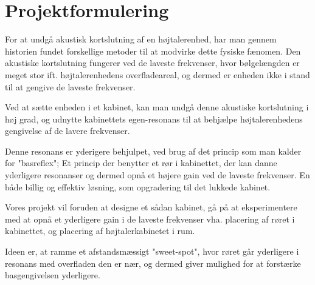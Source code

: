 \chapter{Projektformulering}

For at undgå akustisk kortslutning af en højtalerenhed, har man gennem historien fundet forskellige metoder til at modvirke dette fysiske fænomen. 
Den akustiske kortslutning fungerer ved de laveste frekvenser, hvor bølgelængden er meget stor ift. højtalerenhedens overfladeareal, og dermed er enheden ikke i stand til at gengive de laveste frekvenser.

Ved at sætte enheden i et kabinet, kan man undgå denne akustiske kortslutning i høj grad, og udnytte kabinettets egen-resonans til at behjælpe højtalerenhedens gengivelse af de lavere frekvenser. 

Denne resonans er yderigere behjulpet, ved brug af det princip som man kalder for "basreflex"; Et princip der benytter et rør i kabinettet, der kan danne yderligere resonanser og dermed opnå et højere gain ved de laveste frekvenser. En både billig og effektiv løsning, som opgradering til det lukkede kabinet. 

Vores projekt vil foruden at designe et sådan kabinet, gå på at eksperimentere med at opnå et yderligere gain i de laveste frekvenser vha. placering af røret i kabinettet, og placering af højtalerkabinetet i rum. 

Ideen er, at ramme et afstandsmæssigt "sweet-spot", hvor røret går yderligere i resonans med overfladen den er nær, og dermed giver mulighed for at forstærke basgengivelsen yderligere.  

